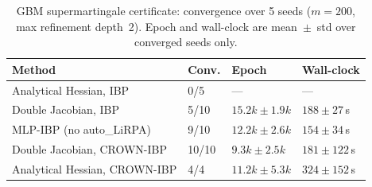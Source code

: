 \begin{table}[H]
\centering
\caption{GBM supermartingale certificate: convergence over 5 seeds ($m=200$, max refinement depth~2). Epoch and wall-clock are mean~$\pm$~std over converged seeds only.}
\label{tab:gbm_comparison}
\begin{tabular}{llll}
\toprule
Method & Conv. & Epoch & Wall-clock \\
\midrule
Analytical Hessian, IBP & 0/5 & --- & --- \\
Double Jacobian, IBP & 5/10 & $15.2k \pm 1.9k$ & $188 \pm 27$\,s \\
MLP-IBP (no auto_LiRPA) & 9/10 & $12.2k \pm 2.6k$ & $154 \pm 34$\,s \\
Double Jacobian, CROWN-IBP & 10/10 & $9.3k \pm 2.5k$ & $181 \pm 122$\,s \\
Analytical Hessian, CROWN-IBP & 4/4 & $11.2k \pm 5.3k$ & $324 \pm 152$\,s \\
\bottomrule
\end{tabular}
\end{table}
